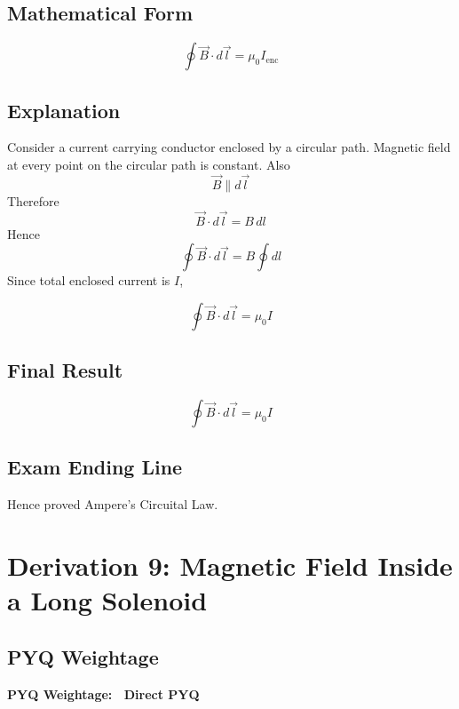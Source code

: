 \documentclass[11pt,a4paper]{article}
\begin{document}
\subsection*{Mathematical Form}
\begin{tcolorbox}[colback=RoyalBlue!5!white, colframe=RoyalBlue]
    \[ \oint \vec{B} \cdot d\vec{l} = \mu_0 I_{\text{enc}} \]
\end{tcolorbox}

\subsection*{Explanation}
Consider a current carrying conductor enclosed by a circular path. Magnetic field at every point on the circular path is constant.
Also
\[ \vec{B} \parallel d\vec{l} \]
Therefore
\[ \vec{B} \cdot d\vec{l} = B \, dl \]
Hence
\[ \oint \vec{B} \cdot d\vec{l} = B \oint dl \]
Since total enclosed current is \( I \),
\begin{tcolorbox}[colback=RoyalBlue!5!white, colframe=RoyalBlue]
    \[ \oint \vec{B} \cdot d\vec{l} = \mu_0 I \]
\end{tcolorbox}

\subsection*{Final Result}
\begin{tcolorbox}[colback=RoyalBlue!5!white, colframe=RoyalBlue]
    \[ \oint \vec{B} \cdot d\vec{l} = \mu_0 I \]
\end{tcolorbox}

\subsection*{Exam Ending Line}
Hence proved Ampere's Circuital Law.

\newpage

\section{Derivation 9: Magnetic Field Inside a Long Solenoid}

\subsection*{PYQ Weightage}
\begin{tcolorbox}[colback=yellow!10!white, colframe=orange, halign=center]
    \textbf{PYQ Weightage: \textasteriskcentered\textasteriskcentered\textasteriskcentered\textasteriskcentered\textasteriskcentered\ Direct PYQ}
\end{tcolorbox}
\end{document}
